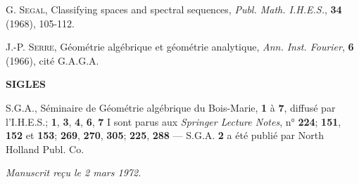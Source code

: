 \documentclass[11pt,leqno]{article}
\begin{document}
{\noindent [14] G. \textsc{Segal}, Classifying spaces and spectral sequences, \textit{Publ. Math. I.H.E.S.}, \textbf{34} (1968), 105-112.

\noindent [15] J.-P. \textsc{Serre}, Géométrie algébrique et géométrie analytique, \textit{Ann. Inst. Fourier}, \textbf{6} (1966), cité G.A.G.A.

\begin{center}
\textbf{SIGLES}
\end{center}

\noindent S.G.A., Séminaire de Géométrie algébrique du Bois-Marie, \textbf{1} à \textbf{7}, diffusé par l’I.H.E.S.; \textbf{1}, \textbf{3}, \textbf{4}, \textbf{6}, \textbf{7} I sont parus aux \textit{Springer Lecture Notes}, n° \textbf{224}; \textbf{151}, \textbf{152} et \textbf{153}; \textbf{269}, \textbf{270}, \textbf{305}; \textbf{225}, \textbf{288} — S.G.A. \textbf{2} a été publié par North Holland Publ. Co.
\par
}

\begin{flushright}
\textit{Manuscrit reçu le 2 mars 1972.}
\end{flushright}
\end{document}

